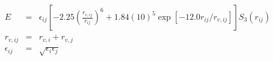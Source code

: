 \documentclass[12pt]{article}
\begin{document}
  \thispagestyle{empty}
\begin{eqnarray*}
  E &=& \epsilon_{ij} \left[ -2.25 \left(\frac{r_{v,ij}}{r_{ij}}\right)^6 + 1.84(10)^5 \exp\left[-12.0 r_{ij}/r_{v,ij}\right] \right] S_3(r_{ij}) \\
  r_{v,ij} &=& r_{v,i} + r_{v,j} \\ 
  \epsilon_{ij} &=& \sqrt{\epsilon_i \epsilon_j}
\end{eqnarray*}
\end{document}

